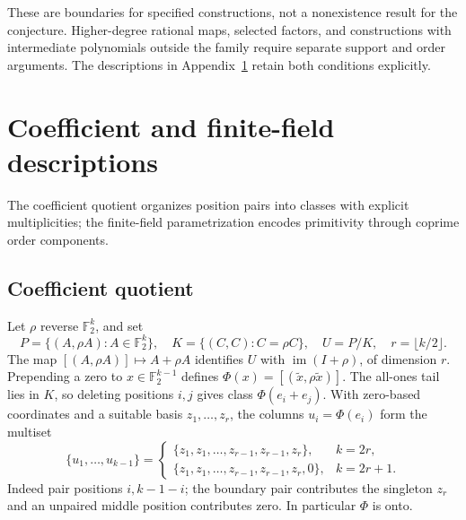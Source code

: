 \documentclass[11pt]{article}
\theoremstyle{definition}
\theoremstyle{remark}
\begin{document}
These are boundaries for specified constructions, not a
nonexistence result for the conjecture. Higher-degree rational
maps, selected factors, and constructions with intermediate
polynomials outside the family require separate support and
order arguments. The descriptions in
Appendix~\ref{sec:classical-descriptions} retain both conditions
explicitly.

\appendix
\section{Coefficient and finite-field descriptions}\label{sec:classical-descriptions}
The coefficient quotient organizes position pairs into classes with explicit
multiplicities; the finite-field parametrization encodes primitivity
through coprime order components.

\subsection{Coefficient quotient}\label{sec:quotient}
Let $\rho$ reverse $\mathbb F_2^k$, and set
\[
 P=\{(A,\rho A):A\in\mathbb F_2^k\},\quad
 K=\{(C,C):C=\rho C\},\quad U=P/K,\quad r=\lfloor k/2\rfloor.
\]
The map $[(A,\rho A)]\mapsto A+\rho A$ identifies $U$ with
$\operatorname{im}(I+\rho)$, of dimension $r$.
Prepending a zero to $x\in\mathbb F_2^{k-1}$ defines
$\Phi(x)=[(\widetilde x,\rho\widetilde x)]$.
The all-ones tail lies in $K$, so deleting positions $i,j$ gives
class $\Phi(e_i+e_j)$. With zero-based coordinates and a suitable basis
$z_1,\ldots,z_r$, the columns $u_i=\Phi(e_i)$ form the multiset
\begin{equation}\label{eq:columns}
 \{u_1,\ldots,u_{k-1}\}=
 \begin{cases}
 \{z_1,z_1,\ldots,z_{r-1},z_{r-1},z_r\},&k=2r,\\
 \{z_1,z_1,\ldots,z_{r-1},z_{r-1},z_r,0\},&k=2r+1.
 \end{cases}
\end{equation}
Indeed pair positions $i,k-1-i$; the boundary pair contributes the
singleton $z_r$ and an unpaired middle position contributes zero.
In particular $\Phi$ is onto.
\end{document}
